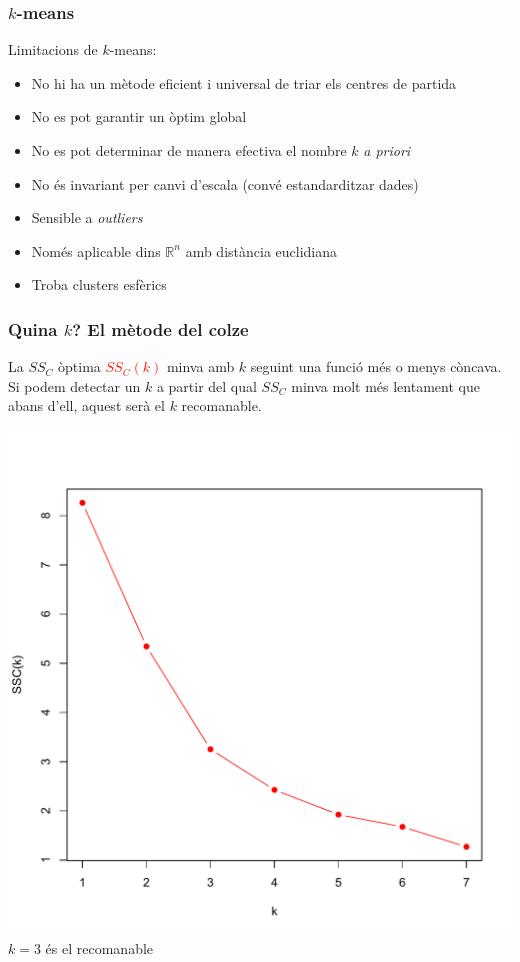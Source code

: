 \documentclass[12pt,t]{beamer}
\newcommand{\red}[1]{\textcolor{red}{#1}}
\newcommand{\RR}{\mathbb{R}}
\theoremstyle{plain}
\theoremstyle{definition}
\begin{document}
\begin{frame}
\frametitle{$k$-means}
Limitacions de $k$-means:
\begin{itemize}
\item No hi ha un mètode eficient i universal de triar els centres de partida

\item No es pot garantir un òptim global

\item No es pot determinar de manera efectiva el nombre $k$ \textsl{a priori}

\item No és invariant per canvi d'escala (convé estandarditzar dades)

\item Sensible a \textsl{outliers}

\item Només aplicable dins $\RR^n$ amb distància euclidiana

\item Troba clusters esfèrics

\end{itemize}
\end{frame}

\begin{frame}
\frametitle{Quina $k$? El mètode del colze}


La $SS_C$ òptima \red{$SS_C(k)$} minva amb $k$ seguint una funció més o menys còncava. 
Si podem detectar un $k$ a partir del qual $SS_C$ minva molt més lentament que abans d'ell, aquest serà el $k$ recomanable.
\vspace*{-2ex}
\begin{center}
\includegraphics[width=0.58 \linewidth]{kink.pdf}\\[-1.5ex]
$k=3$ és el recomanable
\end{center}

\end{frame}
\end{document}
